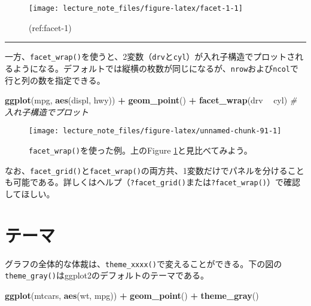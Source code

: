 \documentclass[]{book}
\newenvironment{Shaded}{\begin{snugshade}}{\end{snugshade}}
\newcommand{\KeywordTok}[1]{\textcolor[rgb]{0.13,0.29,0.53}{\textbf{#1}}}
\newcommand{\StringTok}[1]{\textcolor[rgb]{0.31,0.60,0.02}{#1}}
\newcommand{\CommentTok}[1]{\textcolor[rgb]{0.56,0.35,0.01}{\textit{#1}}}
\newcommand{\OperatorTok}[1]{\textcolor[rgb]{0.81,0.36,0.00}{\textbf{#1}}}
\newcommand{\NormalTok}[1]{#1}
\begin{document}
\begin{figure}

{\centering \texttt{[image: lecture\_note\_files/figure-latex/facet-1-1]} 

}

\caption{(ref:facet-1)}\label{fig:facet-1}
\end{figure}

\begin{center}\rule{0.5\linewidth}{\linethickness}\end{center}

一方、\texttt{facet\_wrap()}を使うと、2変数（\texttt{drv}と\texttt{cyl}）が入れ子構造でプロットされるようになる。デフォルトでは縦横の枚数が同じになるが、\texttt{nrow}および\texttt{ncol}で行と列の数を指定できる。




\begin{Shaded}
\begin{Highlighting}[]
\KeywordTok{ggplot}\NormalTok{(mpg, }\KeywordTok{aes}\NormalTok{(displ, hwy)) }\OperatorTok{+}
\StringTok{  }\KeywordTok{geom_point}\NormalTok{() }\OperatorTok{+}
\StringTok{  }\KeywordTok{facet_wrap}\NormalTok{(drv }\OperatorTok{~}\StringTok{ }\NormalTok{cyl) }\CommentTok{# 入れ子構造でプロット}
\end{Highlighting}
\end{Shaded}

\begin{figure}

{\centering \texttt{[image: lecture\_note\_files/figure-latex/unnamed-chunk-91-1]} 

}

\caption{\texttt{facet\_wrap()}を使った例。上のFigure
\ref{fig:facet-1}と見比べてみよう。}\label{fig:unnamed-chunk-91}
\end{figure}

なお、\texttt{facet\_grid()}と\texttt{facet\_wrap()}の両方共、1変数だけでパネルを分けることも可能である。詳しくはヘルプ（\texttt{?facet\_grid()}または\texttt{?facet\_wrap()}）で確認してほしい。

\section{テーマ}

グラフの全体的な体裁は、\texttt{theme\_xxxx()}で変えることができる。下の図の\texttt{theme\_gray()}はggplot2のデフォルトのテーマである。



\begin{Shaded}
\begin{Highlighting}[]
\KeywordTok{ggplot}\NormalTok{(mtcars, }\KeywordTok{aes}\NormalTok{(wt, mpg)) }\OperatorTok{+}
\StringTok{  }\KeywordTok{geom_point}\NormalTok{() }\OperatorTok{+}
\StringTok{  }\KeywordTok{theme_gray}\NormalTok{()}
\end{Highlighting}
\end{Shaded}
\end{document}
